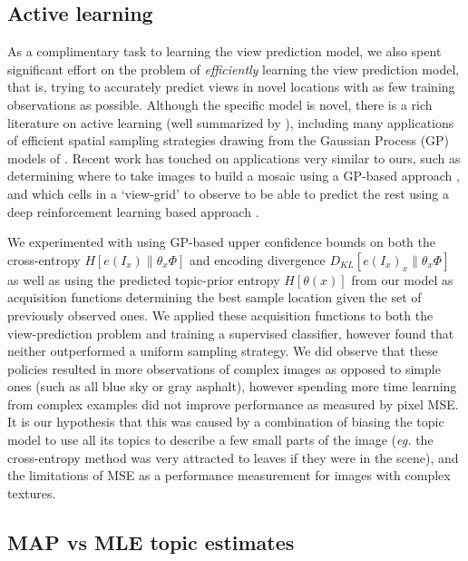 \subsection{Active learning}\label{sec:active-learning}
As a complimentary task to learning the view prediction model, we also spent significant effort on the problem of \emph{efficiently} learning the view prediction model, that is, trying to accurately predict views in novel locations with as few training observations as possible. Although the specific model is novel, there is a rich literature on active learning (well summarized by \citep{settles2012active}), including many applications of efficient spatial sampling strategies drawing from the Gaussian Process (GP) models of \citep{Seo2000,guestrin2005near}. Recent work has touched on applications very similar to ours, such as determining where to take images to build a mosaic using a GP-based approach \citep{sandeep_crv_2016}, and which cells in a `view-grid' to observe to be able to predict the rest using a deep reinforcement learning based approach \citep{Jayaraman2017}.

We experimented with using GP-based upper confidence bounds on both the cross-entropy $H\left[e(I_x) \| \theta_x\Phi \right]$ and encoding divergence $D_{KL}\left[e(I_x)_x \| \theta_x\Phi\right]$ as well as using the predicted topic-prior entropy $H\left[\theta(x)\right]$ from our model as acquisition functions determining the best sample location given the set of previously observed ones. We applied these acquisition functions to both the view-prediction problem and training a supervised classifier, however found that neither outperformed a uniform sampling strategy. We did observe that these policies resulted in more observations of complex images as opposed to simple ones (such as all blue sky or gray asphalt), however spending more time learning from complex examples did not improve performance as measured by pixel MSE. It is our hypothesis that this was caused by a combination of biasing the topic model to use all its topics to describe a few small parts of the image (\emph{eg.} the cross-entropy method was very attracted to leaves if they were in the scene), and the limitations of MSE as a performance measurement for images with complex textures.

\subsection{MAP vs MLE topic estimates}

